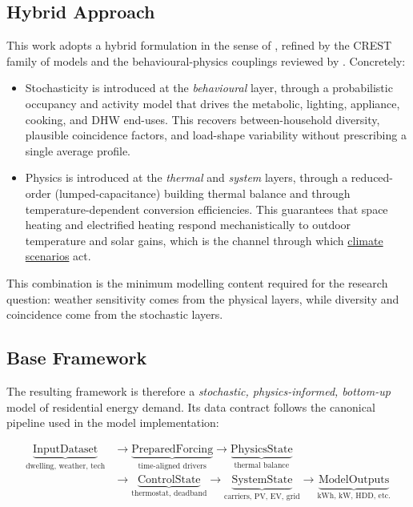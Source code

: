 \subsection{Hybrid Approach}
\label{sec:hybrid_approach}
 
This work adopts a hybrid formulation in the sense of \textcite{Capasso1994}, refined by the CREST family of models \cite{Richardson2010CRESTElectricity,McKenna2015} and the behavioural-physics couplings reviewed by \textcite{Sandels2016,DOca2017}. Concretely:
\begin{itemize}[leftmargin=1.2em, itemsep=2pt, topsep=2pt]
  \item Stochasticity is introduced at the \emph{behavioural} layer, through a probabilistic occupancy and activity model that drives the metabolic, lighting, appliance, cooking, and DHW end-uses. This recovers between-household diversity, plausible coincidence factors, and load-shape variability without prescribing a single average profile.
  \item Physics is introduced at the \emph{thermal} and \emph{system} layers, through a reduced-order (lumped-capacitance) building thermal balance and through temperature-dependent conversion efficiencies. This guarantees that space heating and electrified heating respond mechanistically to outdoor temperature and solar gains, which is the channel through which \hyperref[sec:climateScenariosFramework]{climate scenarios} act.
\end{itemize}
 
This combination is the minimum modelling content required for the research question: weather sensitivity comes from the physical layers, while diversity and coincidence come from the stochastic layers.


\subsection{Base Framework}
\label{sec:base_framework}
 
The resulting framework is therefore a \emph{stochastic, physics-informed, bottom-up} model of residential energy demand. Its data contract follows the canonical pipeline used in the model implementation:
 
\begin{equation}\label{eq:dataContract}
\begin{split}
  \underbrace{\text{InputDataset}}_{\text{dwelling, weather, tech}}
  &\to
  \underbrace{\text{PreparedForcing}}_{\text{time-aligned drivers}}
  \to
  \underbrace{\text{PhysicsState}}_{\text{thermal balance}}\\
  &\to
  \underbrace{\text{ControlState}}_{\text{thermostat, deadband}}
  \to
  \underbrace{\text{SystemState}}_{\text{carriers, PV, EV, grid}}
  \to
  \underbrace{\text{ModelOutputs}}_{\text{kWh, kW, HDD, etc.}}
\end{split}
\end{equation}
 
